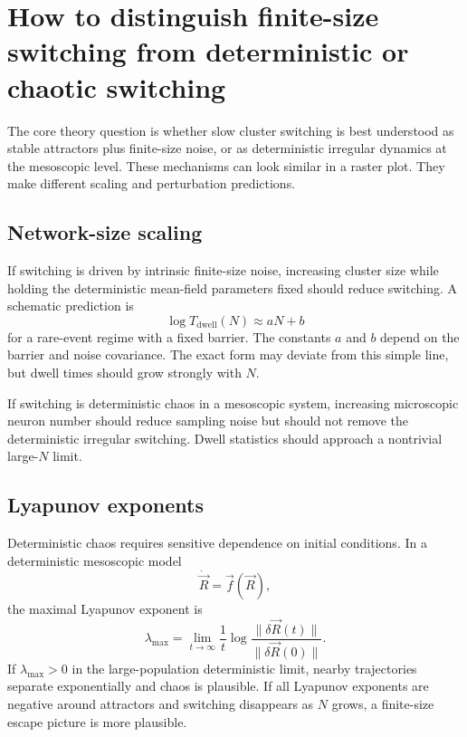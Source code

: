 \section{How to distinguish finite-size switching from deterministic or chaotic switching}
\label{sec:distinguish-finite-size-chaotic-switching}

The core theory question is whether slow cluster switching is best understood as stable attractors plus finite-size noise, or as deterministic irregular dynamics at the mesoscopic level. These mechanisms can look similar in a raster plot. They make different scaling and perturbation predictions.

\subsection{Network-size scaling}

If switching is driven by intrinsic finite-size noise, increasing cluster size while holding the deterministic mean-field parameters fixed should reduce switching. A schematic prediction is
%
\begin{equation}
  \log T_{\mathrm{dwell}}(N)
  \approx
  aN+b
  \label{eq:dwell-log-linear-size}
\end{equation}
%
for a rare-event regime with a fixed barrier. The constants $a$ and $b$ depend on the barrier and noise covariance. The exact form may deviate from this simple line, but dwell times should grow strongly with $N$.

If switching is deterministic chaos in a mesoscopic system, increasing microscopic neuron number should reduce sampling noise but should not remove the deterministic irregular switching. Dwell statistics should approach a nontrivial large-$N$ limit.

\subsection{Lyapunov exponents}

Deterministic chaos requires sensitive dependence on initial conditions. In a deterministic mesoscopic model
%
\begin{equation}
  \dot{\vec R}=\vec f(\vec R),
  \label{eq:ch09-deterministic-mesoscopic-system}
\end{equation}
%
the maximal Lyapunov exponent is
%
\begin{equation}
  \lambda_{\max}
  =
  \lim_{t\to\infty}
  \frac{1}{t}
  \log
  \frac{\|\delta \vec R(t)\|}{\|\delta \vec R(0)\|}.
  \label{eq:max-lyapunov}
\end{equation}
%
If $\lambda_{\max}>0$ in the large-population deterministic limit, nearby trajectories separate exponentially and chaos is plausible. If all Lyapunov exponents are negative around attractors and switching disappears as $N$ grows, a finite-size escape picture is more plausible.

